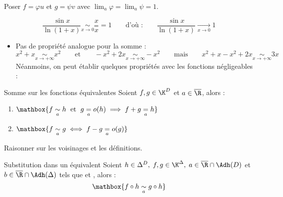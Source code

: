 \documentclass[12pt,a4paper]{report}
\begin{document}
\begin{demo}
    Poser $f = \varphi u$ et $g = \psi v$ avec $\displaystyle \lim_a \varphi = \lim_a \psi = 1$.
\end{demo}

\begin{exemple}
    $$ \dfrac{\sin x}{\ln(1+x)} \underset{x \to 0}{\sim} \dfrac{x}{x} = 1 \qquad \text{d'où :} \qquad \dfrac{\sin x}{\ln(1+x)} \xrightarrow[x \to 0]{} 1 $$
\end{exemple}

\begin{remarque}
    \begin{itemize}
        \item[\danger] Pas de propriété analogue pour la somme :
        $$ x^2 + x \underset{x \to +\infty}{\sim} x^2 \qquad \text{et} \qquad -x^2 + 2x \underset{x \to +\infty}{\sim} -x^2 \qquad \text{mais} \qquad x^2 + x -x^2 + 2x \underset{x \to +\infty}{\sim} 3x $$
        Néanmoins, on peut établir quelques propriétés avec les fonctions négligeables :
    \end{itemize}
\end{remarque}

\begin{proposition}{Somme sur les fonctions équivalentes}{}
    Soient $f, g \in \K^D$ et $a \in \overline{\R}$, alors :
    \begin{multicols}{2}
    \begin{enumerate}
        \item $ \mathbox{f \underset{a}{\sim} h \; \text{ et } \; g \underset{a}{=} o(h) \; \Longrightarrow \; f + g \underset{a}{=} h} $
        \item $ \mathbox{f \underset{a}{\sim} g \; \Longleftrightarrow \; f - g \underset{a}{=} o(g)} $
    \end{enumerate}
    \end{multicols}
    \vspace*{-5pt}
\end{proposition}

\begin{demo}
    Raisonner sur les voisinages et les définitions.
\end{demo}

\begin{proposition}{Substitution dans un équivalent}{}
    Soient $h \in \Delta^D, \; f, g \in \K^\Delta, \; a \in \overline{\R} \cap \Adh(D)$ et $b \in \overline{\R} \cap \Adh(\Delta)$ tels que  et , alors :
    $$ \mathbox{f \circ h \underset{a}{\sim} g \circ h} $$
\end{proposition}
\end{document}
